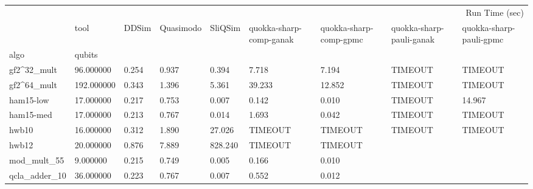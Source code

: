 \begin{tabular}{lllllllll}
\toprule
 &  & \multicolumn{7}{r}{Run Time (sec)} \\
 & tool & DDSim & Quasimodo & SliQSim & quokka-sharp-comp-ganak & quokka-sharp-comp-gpmc & quokka-sharp-pauli-ganak & quokka-sharp-pauli-gpmc \\
algo & qubits &  &  &  &  &  &  &  \\
\midrule
gf2^32_mult & 96.000000 & 0.254 & 0.937 & 0.394 & 7.718 & 7.194 & TIMEOUT & TIMEOUT \\
\cline{1-9}
gf2^64_mult & 192.000000 & 0.343 & 1.396 & 5.361 & 39.233 & 12.852 & TIMEOUT & TIMEOUT \\
\cline{1-9}
ham15-low & 17.000000 & 0.217 & 0.753 & 0.007 & 0.142 & 0.010 & TIMEOUT & 14.967 \\
\cline{1-9}
ham15-med & 17.000000 & 0.213 & 0.767 & 0.014 & 1.693 & 0.042 & TIMEOUT & TIMEOUT \\
\cline{1-9}
hwb10 & 16.000000 & 0.312 & 1.890 & 27.026 & TIMEOUT & TIMEOUT & TIMEOUT & TIMEOUT \\
\cline{1-9}
hwb12 & 20.000000 & 0.876 & 7.889 & 828.240 & TIMEOUT & TIMEOUT &  &  \\
\cline{1-9}
mod_mult_55 & 9.000000 & 0.215 & 0.749 & 0.005 & 0.166 & 0.010 &  &  \\
\cline{1-9}
qcla_adder_10 & 36.000000 & 0.223 & 0.767 & 0.007 & 0.552 & 0.012 &  &  \\
\cline{1-9}
\bottomrule
\end{tabular}
